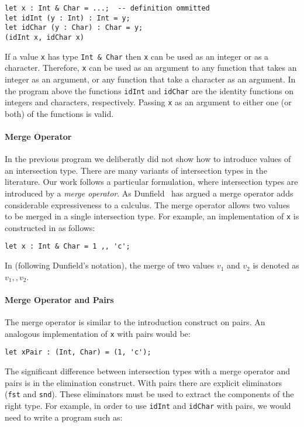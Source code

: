 \begin{lstlisting}
let x : Int & Char = ...;  -- definition ommitted
let idInt (y : Int) : Int = y;
let idChar (y : Char) : Char = y;
(idInt x, idChar x)
\end{lstlisting}

\noindent If a value \lstinline{x} has type \lstinline{Int & Char} then
\lstinline{x} can be used as an integer or as a character. Therefore,
\lstinline{x} can be used as an argument to any function that takes
an integer as an argument, or any
function that take a character as an argument. In the program above
the functions \lstinline{idInt} and \lstinline{idChar} are the
identity functions on integers and characters, respectively. 
Passing \lstinline{x} as an argument to either one (or both) of the
functions is valid.

\paragraph{Merge Operator}
In the previous program we deliberatly did not show how to introduce values of an
intersection type. There are many variants of intersection types
in the literature. Our work follows a particular formulation, where
intersection types are introduced by a \emph{merge operator}. 
As Dunfield~\cite{dunfield2014elaborating} has argued a merge operator adds considerable
expressiveness to a calculus. The merge operator allows
two values to be merged in a single intersection type. For example, an
implementation of \lstinline{x} is constructed in \name as follows:

\begin{lstlisting}
let x : Int & Char = 1 ,, 'c';
\end{lstlisting}

\noindent In \name (following Dunfield's notation), the
merge of two values $v_1$ and $v_2$ is denoted as $v_1 ,, v_2$.

\paragraph{Merge Operator and Pairs}
The merge operator is similar to the introduction construct on pairs.
An analogous implementation of \lstinline{x} with pairs would be:

\begin{lstlisting}
let xPair : (Int, Char) = (1, 'c');
\end{lstlisting}

\noindent The significant difference between intersection types with a
merge operator and pairs is in the elimination construct. With pairs
there are explicit eliminators (\lstinline{fst} and
\lstinline{snd}). These eliminators must be used to extract the
components of the right type. For example, in order to use
\lstinline{idInt} and \lstinline{idChar} with pairs, we would need to
write a program such as:

